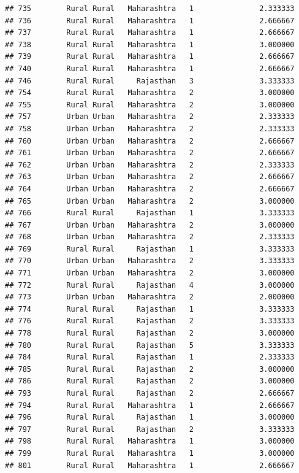 \documentclass[
]{article}
\begin{document}
\begin{verbatim}
## 735        Rural Rural   Maharashtra   1               2.333333
## 736        Rural Rural   Maharashtra   1               2.666667
## 737        Rural Rural   Maharashtra   1               2.666667
## 738        Rural Rural   Maharashtra   1               3.000000
## 739        Rural Rural   Maharashtra   1               2.666667
## 740        Rural Rural   Maharashtra   1               2.666667
## 746        Rural Rural     Rajasthan   3               3.333333
## 754        Rural Rural   Maharashtra   2               3.000000
## 755        Rural Rural   Maharashtra   2               3.000000
## 757        Urban Urban   Maharashtra   2               2.333333
## 758        Urban Urban   Maharashtra   2               2.333333
## 760        Urban Urban   Maharashtra   2               2.666667
## 761        Urban Urban   Maharashtra   2               2.666667
## 762        Urban Urban   Maharashtra   2               2.333333
## 763        Urban Urban   Maharashtra   2               2.666667
## 764        Urban Urban   Maharashtra   2               2.666667
## 765        Urban Urban   Maharashtra   2               3.000000
## 766        Rural Rural     Rajasthan   1               3.333333
## 767        Urban Urban   Maharashtra   2               3.000000
## 768        Urban Urban   Maharashtra   2               2.333333
## 769        Rural Rural     Rajasthan   1               3.333333
## 770        Urban Urban   Maharashtra   2               3.333333
## 771        Urban Urban   Maharashtra   2               3.000000
## 772        Rural Rural     Rajasthan   4               3.000000
## 773        Urban Urban   Maharashtra   2               2.000000
## 774        Rural Rural     Rajasthan   1               3.333333
## 776        Rural Rural     Rajasthan   2               3.333333
## 778        Rural Rural     Rajasthan   2               3.000000
## 780        Rural Rural     Rajasthan   5               3.333333
## 784        Rural Rural     Rajasthan   1               2.333333
## 785        Rural Rural     Rajasthan   2               3.000000
## 786        Rural Rural     Rajasthan   2               3.000000
## 793        Rural Rural     Rajasthan   2               2.666667
## 794        Rural Rural   Maharashtra   1               2.666667
## 796        Rural Rural     Rajasthan   1               3.000000
## 797        Rural Rural     Rajasthan   2               3.333333
## 798        Rural Rural   Maharashtra   1               3.000000
## 799        Rural Rural   Maharashtra   1               3.000000
## 801        Rural Rural   Maharashtra   1               2.666667

\end{verbatim}
\end{document}

